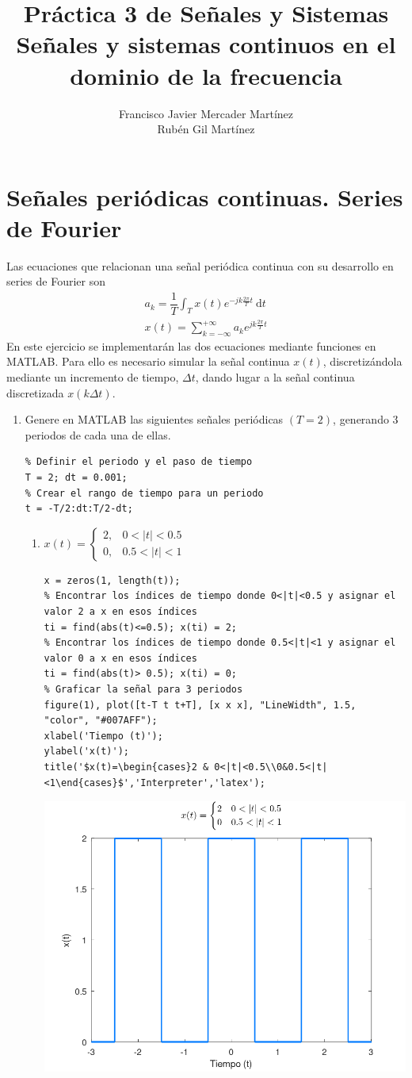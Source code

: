 \documentclass{article}
\title{\textbf{\huge Práctica 3 de Señales y Sistemas}\\ Señales y sistemas continuos en el dominio de la frecuencia}
\author{Francisco Javier Mercader Martínez\\ Rubén Gil Martínez}
\date{}
\newcommand{\dt}{\:\mathrm{d}t}
\begin{document}
\section{Señales periódicas continuas. Series de Fourier}
Las ecuaciones que relacionan una señal periódica continua con su desarrollo en series de Fourier son \[ \begin{array}{l}
a_k=\dfrac{1}{T}\int_Tx(t)e^{-jk\frac{2\pi}{T}t}\dt\\
x(t)=\sum_{k=-\infty}^{+\infty}a_ke^{jk\frac{2\pi}{T}t}
\end{array} \]
En este ejercicio se implementarán las dos ecuaciones mediante funciones en MATLAB. Para ello es necesario simular la señal continua $x(t)$, discretizándola mediante un incremento de tiempo, $\Delta t$, dando lugar a la señal continua discretizada $x(k\Delta t)$.
\begin{enumerate}[leftmargin=*]
\item Genere en MATLAB las siguientes señales periódicas $(T=2)$, generando 3 periodos de cada una de ellas.

\begin{lstlisting}
% Definir el periodo y el paso de tiempo
T = 2; dt = 0.001;
% Crear el rango de tiempo para un periodo
t = -T/2:dt:T/2-dt;
\end{lstlisting}
\begin{enumerate}[label=\alph*)]
\item $x(t)=\begin{cases}
2, & 0<|t|<0.5\\
0,&0.5<|t|<1
\end{cases}$

\begin{lstlisting}
x = zeros(1, length(t));
% Encontrar los índices de tiempo donde 0<|t|<0.5 y asignar el valor 2 a x en esos índices
ti = find(abs(t)<=0.5); x(ti) = 2;
% Encontrar los índices de tiempo donde 0.5<|t|<1 y asignar el valor 0 a x en esos índices
ti = find(abs(t)> 0.5); x(ti) = 0;
% Graficar la señal para 3 periodos
figure(1), plot([t-T t t+T], [x x x], "LineWidth", 1.5, "color", "#007AFF");
xlabel('Tiempo (t)');
ylabel('x(t)');
title('$x(t)=\begin{cases}2 & 0<|t|<0.5\\0&0.5<|t|<1\end{cases}$','Interpreter','latex');
\end{lstlisting}

\begin{center}
\includegraphics[width=0.7\linewidth]{Imágenes/Figura1}
\end{center}


\end{enumerate}
\end{enumerate}
\end{document}
